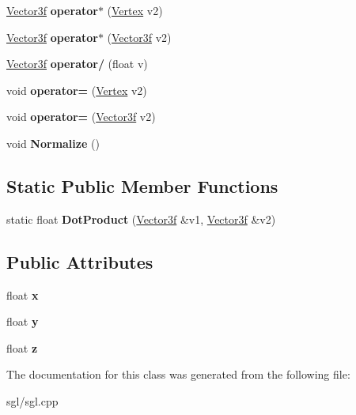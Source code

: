 \begin{DoxyCompactItemize}
\item 
\mbox{\label{class_vector3f_a4a1505e87eb9d13a6aeded805aeb92bb}} 
\hyperlink{class_vector3f}{Vector3f} {\bfseries operator$\ast$} (\hyperlink{class_vertex}{Vertex} v2)
\item 
\mbox{\label{class_vector3f_a3affdcd47ad900f87e9ff310efd37a7e}} 
\hyperlink{class_vector3f}{Vector3f} {\bfseries operator$\ast$} (\hyperlink{class_vector3f}{Vector3f} v2)
\item 
\mbox{\label{class_vector3f_a4ea1191fa08b53a058d6bd0994421bad}} 
\hyperlink{class_vector3f}{Vector3f} {\bfseries operator/} (float v)
\item 
\mbox{\label{class_vector3f_a0be10a85c33bb64628c4934b42cc16fd}} 
void {\bfseries operator=} (\hyperlink{class_vertex}{Vertex} v2)
\item 
\mbox{\label{class_vector3f_afd0805b398d4b20e84a7b00aed7782eb}} 
void {\bfseries operator=} (\hyperlink{class_vector3f}{Vector3f} v2)
\item 
\mbox{\label{class_vector3f_a7ae034cf6d017074dfe1fdac8e251671}} 
void {\bfseries Normalize} ()
\end{DoxyCompactItemize}
\subsection*{Static Public Member Functions}
\begin{DoxyCompactItemize}
\item 
\mbox{\label{class_vector3f_aae3f6360e241157bef0ba864a3d441bf}} 
static float {\bfseries Dot\+Product} (\hyperlink{class_vector3f}{Vector3f} \&v1, \hyperlink{class_vector3f}{Vector3f} \&v2)
\end{DoxyCompactItemize}
\subsection*{Public Attributes}
\begin{DoxyCompactItemize}
\item 
\mbox{\label{class_vector3f_a4aca0751716b7099b397e8c63b16bfcf}} 
float {\bfseries x}
\item 
\mbox{\label{class_vector3f_a8a602e2ee75126feb520c2aa27e7eff5}} 
float {\bfseries y}
\item 
\mbox{\label{class_vector3f_a470cff51eb6463672be518f5af4e26db}} 
float {\bfseries z}
\end{DoxyCompactItemize}


The documentation for this class was generated from the following file\+:\begin{DoxyCompactItemize}
\item 
sgl/sgl.\+cpp\end{DoxyCompactItemize}
